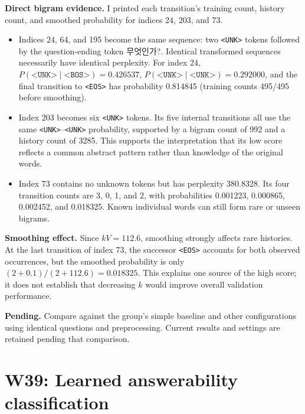 \documentclass[11pt,a4paper]{article}
\newcommand{\KO}[1]{{\koreanfont #1}}
\newcommand{\unk}{\texttt{<UNK>}}
\newcommand{\bos}{\texttt{<BOS>}}
\newcommand{\eos}{\texttt{<EOS>}}
\begin{document}
\textbf{Direct bigram evidence.} I printed each transition's training count, history count, and smoothed probability for indices 24, 203, and 73.
\begin{itemize}
\item Indices 24, 64, and 195 become the same sequence: two \unk{} tokens followed by the question-ending token \KO{무엇인가?}. Identical transformed sequences necessarily have identical perplexity. For index 24, $P(\unk{}\mid\bos{})=0.426537$, $P(\unk{}\mid\unk{})=0.292000$, and the final transition to \eos{} has probability 0.814845 (training counts 495/495 before smoothing).
\item Index 203 becomes six \unk{} tokens. Its five internal transitions all use the same \unk{}--\unk{} probability, supported by a bigram count of 992 and a history count of 3285. This supports the interpretation that its low score reflects a common abstract pattern rather than knowledge of the original words.
\item Index 73 contains no unknown tokens but has perplexity 380.8328. Its four transition counts are 3, 0, 1, and 2, with probabilities 0.001223, 0.000865, 0.002452, and 0.018325. Known individual words can still form rare or unseen bigrams.
\end{itemize}

\textbf{Smoothing effect.} Since $kV=112.6$, smoothing strongly affects rare histories. At the last transition of index 73, the successor \eos{} accounts for both observed occurrences, but the smoothed probability is only $(2+0.1)/(2+112.6)=0.018325$. This explains one source of the high score; it does not establish that decreasing $k$ would improve overall validation performance.

\textbf{Pending.} Compare against the group's simple baseline and other configurations using identical questions and preprocessing. Current results and settings are retained pending that comparison.

\section{W39: Learned answerability classification}
\end{document}
